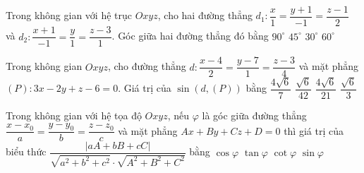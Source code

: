 

\begin{ex}%
	Trong không gian với hệ trục $Oxyz$, cho hai đường  thẳng $d_1\colon \dfrac{x}{1}=\dfrac{y+1}{-1}=\dfrac{z-1}{2}$ và $d_2\colon \dfrac{x+1}{-1}=\dfrac{y}{1}=\dfrac{z-3}{1}$. Góc giữa hai đường thẳng đó bằng
	\choice 
		 {\True $90^{\circ}$}
		 {$45^{\circ}$}
		 {$30^{\circ}$}
		 {$60^{\circ}$}
\end{ex}

\begin{ex}%
	Trong không gian $Oxyz$, cho đường thẳng $d\colon \dfrac{x-4}{2}=\dfrac{y-7}{1}=\dfrac{z-3}{4}$ và mặt phẳng $(P)\colon 3x-2y+z-6=0$. Giá trị  của $\sin (d,(P))$ bằng
	 \choice
		 {$\dfrac{4\sqrt{6}}{7}$}
		{$\dfrac{\sqrt{6}}{42}$} 
		 {\True $\dfrac{4\sqrt{6}}{21}$}
		 {$\dfrac{\sqrt{6}}{3}$}
\end{ex}

\begin{ex}%
	Trong không gian với hệ tọa độ $Oxyz$, nếu $\varphi$ là góc giữa đường thẳng $\dfrac{x-x_0}{a}=\dfrac{y-y_0}{b}=\dfrac{z-z_0}{c}$ và mặt phẳng $Ax+By+Cz+D=0$ thì giá trị của biểu  thức $\dfrac{|aA+bB+cC|}{\sqrt{a^2+b^2+c^2}\cdot \sqrt{A^2+B^2+C^2}}$ bằng
	\choice 
		{$\cos  \varphi$}
		 {$\tan \varphi$}
		{$\cot \varphi$} 
		{\True $\sin \varphi$} 
\end{ex}

